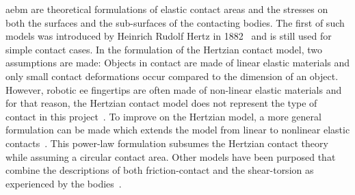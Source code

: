 \gls{aebm} are theoretical formulations of elastic contact areas and the stresses on both the surfaces and the sub-surfaces of the contacting bodies. The first of such models was introduced by Heinrich Rudolf Hertz in \num{1882}~\cite{on-the-contact-of-rigid-elastic-solids-and-on-hardness} and is still used for simple contact cases. In the formulation of the Hertzian contact model, two assumptions are made: Objects in contact are made of linear elastic materials and only small contact deformations occur compared to the dimension of an object. However, robotic \gls{ee} fingertips are often made of non-linear elastic materials and for that reason, the Hertzian contact model does not represent the type of contact in this project~\cite[Chapter 37]{handbook-of-robotics}. To improve on the Hertzian model, a more general formulation can be made which extends the model from linear to nonlinear elastic contacts~\cite{modeling-of-contact-mechanics-and-friction-limit-surfaces-for-soft-fingers-in-robotics-with-experimental-results, the-haptic-and-perceptional-characteristics-of-an-anthropomorphic-curved-soft-finger-structure}. This power-law formulation subsumes the Hertzian contact theory while assuming a circular contact area. Other models have been purposed that combine the descriptions of both friction-contact and the shear-torsion as experienced by the bodies~\cite{the-sliding-of-robot-fingers-under-combined-torsion-and-shear-loading}. \medskip

